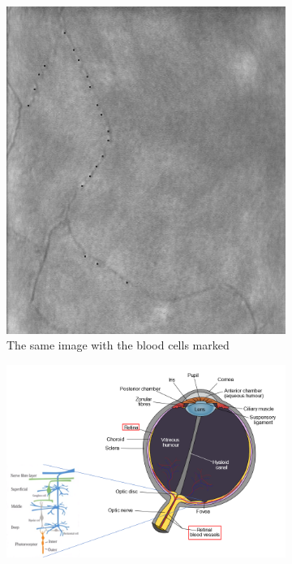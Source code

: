 \documentclass[]{article}
\begin{document}
\begin{figure}
\begin{subfigure}[t]{0.45\textwidth}
		\includegraphics[scale=0.3]{Subject3_Session216_OD_(0,0)_1x1_980_OA790nm_marked_first.jpg}
		\caption{The same image with the blood cells marked}
		\label{fig:eye-capillary-marked}
	\end{subfigure}
	\vfill
	\centering
	\begin{subfigure}[t]{\textwidth}
		\centering
		\includegraphics[width=\textwidth]{eye_anatomy.png}

\end{subfigure}
\end{figure}
\end{document}
